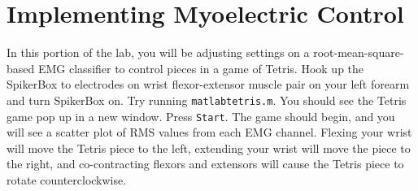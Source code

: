 \documentclass[10pt,oneside,a4paper]{article}
\begin{document}
\section{Implementing Myoelectric Control}
In this portion of the lab, you will be adjusting settings on a root-mean-square-based EMG classifier to control pieces in a game of Tetris. Hook up the SpikerBox to electrodes on wrist flexor-extensor muscle pair on your left forearm and turn SpikerBox on. Try running \texttt{matlabtetris.m}. You should see the Tetris game pop up in a new window. Press \texttt{Start}. The game should begin, and you will see a scatter plot of RMS values from each EMG channel. Flexing your wrist will move the Tetris piece to the left, extending your wrist will move the piece to the right, and co-contracting flexors and extensors will cause the Tetris piece to rotate counterclockwise. 
\end{document}
